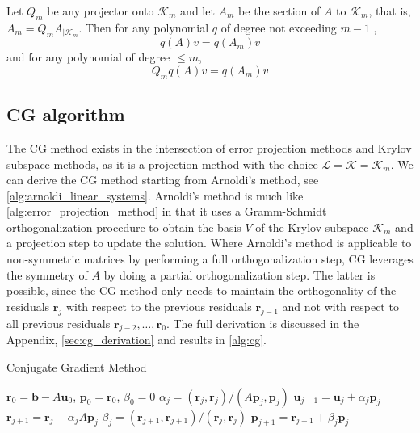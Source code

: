 \begin{theorem}
  Let $Q_m$ be any projector onto $\mathcal{K}_m$ and let $A_m$ be the section of $A$ to $\mathcal{K}_m$, that is, $A_m=Q_m A_{\left.\right|\mathcal{K}_m}$. Then for any polynomial $q$ of degree not exceeding $m-1$ \cite[proposition 6.3]{iter_method_saad},
  \begin{equation*}
    q(A) v=q\left(A_m\right) v
  \end{equation*}
  and for any polynomial of degree $\leq m$,
  \begin{equation*}
    Q_m q(A) v=q\left(A_m\right) v
  \end{equation*}
\end{theorem}

\subsection{CG algorithm}
The CG method exists in the intersection of error projection methods and Krylov subspace methods, as it is a projection method with the choice $\mathcal{L} = \mathcal{K} = \mathcal{K}_m$. We can derive the CG method starting from Arnoldi's method, see \cref{alg:arnoldi_linear_systems}. Arnoldi's method is much like \cref{alg:error_projection_method} in that it uses a Gramm-Schmidt orthogonalization procedure to obtain the basis $V$ of the Krylov subspace $\mathcal{K}_m$ and a projection step to update the solution. Where Arnoldi's method is applicable to non-symmetric matrices by performing a full orthogonalization step, CG leverages the symmetry of $A$ by doing a partial orthogonalization step. The latter is possible, since the CG method only needs to maintain the orthogonality of the residuals $\mathbf{r}_j$ with respect to the previous residuals $\mathbf{r}_{j-1}$ and not with respect to all previous residuals $\mathbf{r}_{j-2}, \dots, \mathbf{r}_0$. The full derivation is discussed in the Appendix, \cref{sec:cg_derivation} and results in \cref{alg:cg}.
\begin{algorithm}[H]
  \caption{Conjugate Gradient Method}
  \begin{algorithmic}
    \State $\mathbf{r}_0 = \mathbf{b} - A\mathbf{u}_0$, $\mathbf{p}_0 = \mathbf{r}_0$, $\beta_0 = 0$
    \State $\alpha_j = (\mathbf{r}_j, \mathbf{r}_j) / (A \mathbf{p}_j, \mathbf{p}_j)$
    \State $\mathbf{u}_{j+1} = \mathbf{u}_j + \alpha_j \mathbf{p}_j$
    \State $\mathbf{r}_{j+1} = \mathbf{r}_j - \alpha_j A \mathbf{p}_j$
    \State $\beta_j = (\mathbf{r}_{j+1}, \mathbf{r}_{j+1}) / (\mathbf{r}_j, \mathbf{r}_j)$
    \State $\mathbf{p}_{j+1} = \mathbf{r}_{j+1} + \beta_j \mathbf{p}_j$
    \EndFor
  \end{algorithmic}
  \label{alg:cg}
\end{algorithm}
